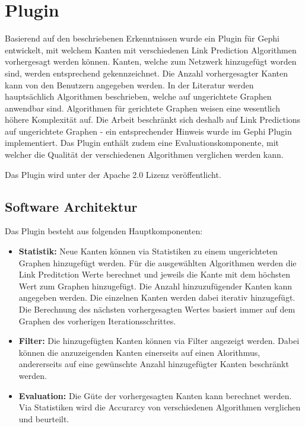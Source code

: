 \chapter{Plugin}

Basierend auf den beschriebenen Erkenntnissen wurde ein Plugin für Gephi entwickelt, mit welchem Kanten mit verschiedenen Link Prediction Algorithmen vorhergesagt werden können.
Kanten, welche zum Netzwerk hinzugefügt worden sind, werden entsprechend gekennzeichnet. Die Anzahl vorhergesagter Kanten kann von den Benutzern angegeben werden.
In der Literatur werden hauptsächlich Algorithmen beschrieben, welche auf ungerichtete Graphen anwendbar sind. Algorithmen für gerichtete Graphen weisen eine wesentlich höhere Komplexität auf. Die Arbeit beschränkt sich deshalb auf Link Predictions auf ungerichtete Graphen -
ein entsprechender Hinweis wurde im Gephi Plugin implementiert. Das Plugin enthält zudem eine Evaluationskomponente, mit welcher die Qualität der verschiedenen Algorithmen verglichen werden kann.

Das Plugin wird unter der Apache 2.0 Lizenz veröffentlicht.

\section{Software Architektur}

Das Plugin besteht aus folgenden Hauptkomponenten:

\begin{itemize}
    \item \textbf{Statistik:} Neue Kanten können via Statistiken zu einem ungerichteten Graphen hinzugefügt werden. Für die ausgewählten Algorithmen werden die Link Preditction Werte berechnet und jeweils die Kante mit dem höchsten Wert zum Graphen hinzugefügt. Die Anzahl hinzuzufügender Kanten kann angegeben werden. Die einzelnen Kanten werden dabei iterativ hinzugefügt. Die Berechnung des nächsten vorhergesagten Wertes basiert immer auf dem Graphen des vorherigen Iterationsschrittes.
    \item \textbf{Filter:} Die hinzugefügten Kanten können via Filter angezeigt werden. Dabei können die anzuzeigenden Kanten einerseits auf einen Alorithmus, andererseits auf eine gewünschte Anzahl hinzugefügter Kanten beschränkt werden.
    \item \textbf{Evaluation:} Die Güte der vorhergesagten Kanten kann berechnet werden. Via Statistiken wird die Accurarcy von verschiedenen Algorithmen verglichen und beurteilt.
\end{itemize}

